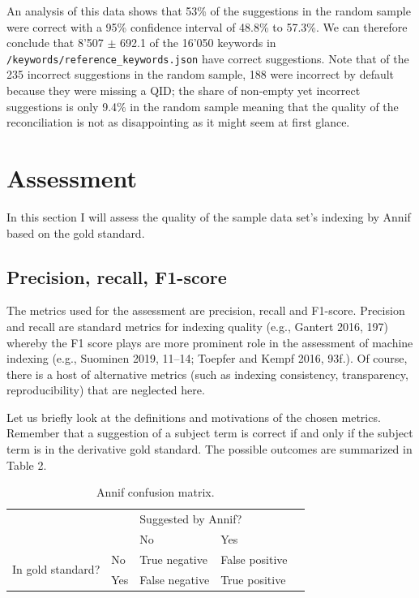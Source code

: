 An analysis of this data shows that 53\% of the suggestions in the
random sample were correct with a 95\% confidence interval of 48.8\% to
57.3\%. We can therefore conclude that 8'507 \(\pm\) 692.1 of the 16'050
keywords in \texttt{/keywords/reference\_keywords.json} have correct
suggestions. Note that of the 235 incorrect suggestions in the random
sample, 188 were incorrect by default because they were missing a QID;
the share of non-empty yet incorrect suggestions is only 9.4\% in the
random sample meaning that the quality of the reconciliation is not as
disappointing as it might seem at first glance.

\hypertarget{assessment}{%
\section{Assessment}\label{assessment}}

In this section I will assess the quality of the sample data set's
indexing by Annif based on the gold standard.

\hypertarget{precision-recall-f1-score}{%
\subsection{Precision, recall,
F1-score}\label{precision-recall-f1-score}}

The metrics used for the assessment are precision, recall and F1-score.
Precision and recall are standard metrics for indexing quality (e.g.,
Gantert 2016, 197) whereby the F1 score plays are more prominent role in
the assessment of machine indexing (e.g., Suominen 2019, 11--14; Toepfer
and Kempf 2016, 93f.). Of course, there is a host of alternative metrics
(such as indexing consistency, transparency, reproducibility) that are
neglected here.

Let us briefly look at the definitions and motivations of the chosen
metrics. Remember that a suggestion of a subject term is correct if and
only if the subject term is in the derivative gold standard. The
possible outcomes are summarized in Table 2.

\begin{table}[h]
\centering
\begin{tabular}{lllll}
 &                       & \multicolumn{2}{l}{Suggested by Annif?}            &  \\ \cline{3-4}
 & \multicolumn{1}{l|}{} & \multicolumn{1}{l|}{No} & \multicolumn{1}{l|}{Yes} &  \\ \cline{2-4}
\multicolumn{1}{l|}{\multirow{2}{*}{In gold standard?}} & \multicolumn{1}{l|}{No}  & \multicolumn{1}{l|}{True negative}  & \multicolumn{1}{l|}{False positive} &  \\ \cline{2-4}
\multicolumn{1}{l|}{}                                   & \multicolumn{1}{l|}{Yes} & \multicolumn{1}{l|}{False negative} & \multicolumn{1}{l|}{True positive}  &  \\ \cline{2-4}
\end{tabular}
\caption{Annif confusion matrix.}
\label{tab:confusion-matrix}
\end{table}

